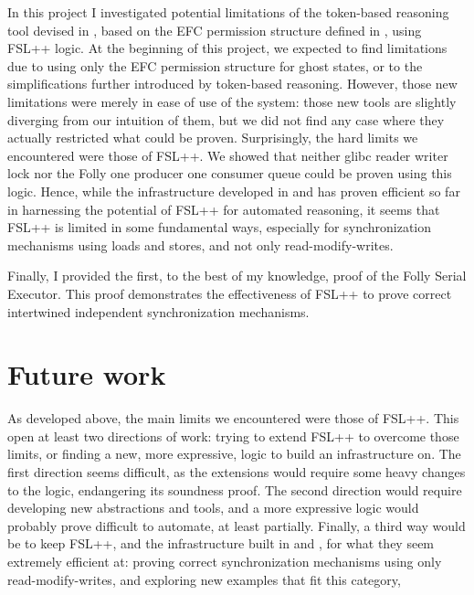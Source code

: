 In this project I investigated potential limitations of the token-based reasoning tool devised in \cite{pascal}, based on the EFC permission structure defined in \cite{gaurav}, using FSL++ logic. At the beginning of this project, we expected to find limitations due to using only the EFC permission structure for ghost states, or to the simplifications further introduced by token-based reasoning. However, those new limitations were merely in ease of use of the system: those new tools are slightly diverging from our intuition of them, but we did not find any case where they actually restricted what could be proven. Surprisingly, the hard limits we encountered were those of FSL++. We showed that neither glibc reader writer lock \cite{glibcRW} nor the Folly one producer one consumer queue \cite{queue} could be proven using this logic. Hence, while the infrastructure developed in \cite{gaurav} and \cite{pascal} has proven efficient so far in harnessing the potential of FSL++ for automated reasoning, it seems that FSL++ is limited in some fundamental ways, especially for synchronization mechanisms using loads and stores, and not only read-modify-writes.

Finally, I provided the first, to the best of my knowledge, proof of the Folly Serial Executor. This proof demonstrates the effectiveness of FSL++ to prove correct intertwined independent synchronization mechanisms.

\section{Future work}

As developed above, the main limits we encountered were those of FSL++. This open at least two directions of work: trying to extend FSL++ to overcome those limits, or finding a new, more expressive, logic to build an infrastructure on. The first direction seems difficult, as the extensions would require some heavy changes to the logic, endangering its soundness proof. The second direction would require developing new abstractions and tools, and a more expressive logic would probably prove difficult to automate, at least partially. Finally, a third way would be to keep FSL++, and the infrastructure built in \cite{gaurav} and \cite{pascal}, for what they seem extremely efficient at: proving correct synchronization mechanisms using only read-modify-writes, and exploring new examples that fit this category,
